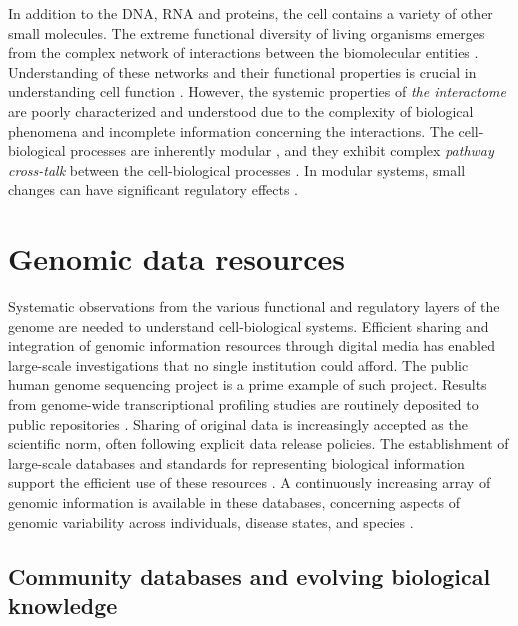 In addition to the DNA, RNA and proteins, the cell contains a variety
of other small molecules. The extreme functional diversity of living
organisms emerges from the complex network of interactions between the
biomolecular entities \citep{Barabasi04, Hartwell99}. Understanding of
these networks and their functional properties is crucial in
understanding cell function \citep{Collins03, Schadt2009}. However,
the systemic properties of {\it the interactome} are poorly
characterized and understood due to the complexity of biological
phenomena and incomplete information concerning the interactions.  The
cell-biological processes are inherently modular \citep{Hartwell99,
  Ihmels02, Lauffenburger00}, and they exhibit complex {\it pathway
  cross-talk} between the cell-biological processes \citep{Li08c}. In
modular systems, small changes can have significant regulatory effects
\citep{Espinosa-Soto2010}.

\section{Genomic data resources}

Systematic observations from the various functional and regulatory
layers of the genome are needed to understand cell-biological
systems. Efficient sharing and integration of genomic information
resources through digital media has enabled large-scale investigations
that no single institution could afford. The public human genome
sequencing project \citep{Lander01} is a prime example of such
project. Results from genome-wide transcriptional profiling studies
are routinely deposited to public repositories \citep{Barrett2009,
  Parkinson2009}. Sharing of original data is increasingly accepted as
the scientific norm, often following explicit data release
policies. The establishment of large-scale databases and standards for
representing biological information support the efficient use of these
resources \citep{Bammler05, Brazma06}. A continuously increasing array
of genomic information is available in these databases, concerning
aspects of genomic variability across individuals, disease states, and
species \citep{Brent2008, Church05, Cochrane2010,
  G10KCOSconsortium2009, tcga08}.

\subsection{Community databases and evolving biological knowledge}
\label{sec:biodata}

